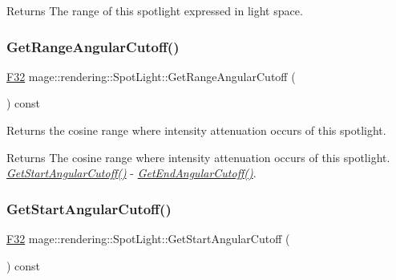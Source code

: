 \begin{DoxyReturn}{Returns}
The range of this spotlight expressed in light space. 
\end{DoxyReturn}
\hypertarget{classmage_1_1rendering_1_1_spot_light_abd442757ce094619b8f4c050e54403e1}{}\label{classmage_1_1rendering_1_1_spot_light_abd442757ce094619b8f4c050e54403e1} 
\subsubsection{\texorpdfstring{Get\+Range\+Angular\+Cutoff()}{GetRangeAngularCutoff()}}
{\footnotesize\ttfamily \hyperlink{namespacemage_aa97e833b45f06d60a0a9c4fc22ae02c0}{F32} mage\+::rendering\+::\+Spot\+Light\+::\+Get\+Range\+Angular\+Cutoff (\begin{DoxyParamCaption}{ }\end{DoxyParamCaption}) const\hspace{0.3cm}{\ttfamily [noexcept]}}

Returns the cosine range where intensity attenuation occurs of this spotlight.

\begin{DoxyReturn}{Returns}
The cosine range where intensity attenuation occurs of this spotlight. {\itshape \hyperlink{classmage_1_1rendering_1_1_spot_light_ab865663954e848ad42c84e759c7ceea7}{Get\+Start\+Angular\+Cutoff()}} -\/ {\itshape \hyperlink{classmage_1_1rendering_1_1_spot_light_aab94a7a9d5434d8e7913d7b52379841b}{Get\+End\+Angular\+Cutoff()}}. 
\end{DoxyReturn}
\hypertarget{classmage_1_1rendering_1_1_spot_light_ab865663954e848ad42c84e759c7ceea7}{}\label{classmage_1_1rendering_1_1_spot_light_ab865663954e848ad42c84e759c7ceea7} 
\subsubsection{\texorpdfstring{Get\+Start\+Angular\+Cutoff()}{GetStartAngularCutoff()}}
{\footnotesize\ttfamily \hyperlink{namespacemage_aa97e833b45f06d60a0a9c4fc22ae02c0}{F32} mage\+::rendering\+::\+Spot\+Light\+::\+Get\+Start\+Angular\+Cutoff (\begin{DoxyParamCaption}{ }\end{DoxyParamCaption}) const\hspace{0.3cm}{\ttfamily [noexcept]}}

